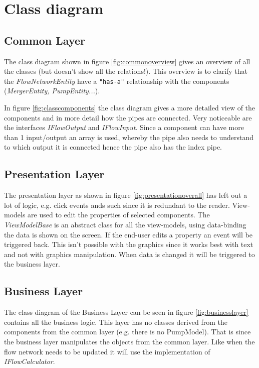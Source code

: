 \chapter{Class diagram}
\section{Common Layer}
The class diagram shown in figure \ref{fig:commonoverview} gives an overview of all the classes (but doesn't show all the relations!). This overview is to clarify that the \emph{FlowNetworkEntity} have a \texttt{"has-a"} relationship with the components (\emph{MergerEntity, PumpEntity...}).

In figure \ref{fig:classcomponents} the class diagram gives a more detailed view of the components and in more detail how the pipes are connected. Very noticeable are the interfaces \emph{IFlowOutput} and \emph{IFlowInput}. Since a component can have more than 1 input/output an array is used, whereby the pipe also needs to understand to which output it is connected hence the pipe also has the index pipe.

\section{Presentation Layer}
The presentation layer as shown in figure \ref{fig:presentationoverall} has left out a lot of logic, e.g. click events ands such since it is redundant to the reader. View-models are used to edit the properties of selected components. The \emph{ViewModelBase} is an abstract class for all the view-models, using data-binding the data is shown on the screen. If the end-user edits a property an event will be triggered back. This isn't possible with the graphics since it works best with text and not with graphics manipulation. When data is changed it will be triggered to the business layer.

\section{Business Layer}
The class diagram of the Business Layer can be seen in figure \ref{fig:businesslayer} contains all the business logic. This layer has no classes derived from the components from the common layer (e.g. there is no PumpModel). That is since the business layer manipulates the objects from the common layer. Like when the flow network needs to be updated it will use the implementation of \emph{IFlowCalculator}. 

